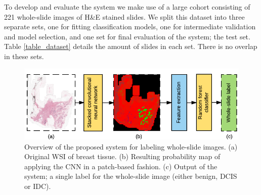 \documentclass[journal]{IEEEtran}
\begin{document}
\bigskip

To develop and evaluate the system we make use of a large cohort consisting of 221 whole-slide images of H\&E stained slides. We split this dataset into three separate sets, one for fitting classification models, one for intermediate validation and model selection, and one set for final evaluation of the system; the test set. Table \ref{table_dataset} details the amount of slides in each set. There is no overlap in these sets.



\begin{figure}[!t]
\centering
\hspace{-0.08in}\includegraphics[width=6in]{system_overview}%
\vspace{-0.1cm}\caption{Overview of the proposed system for labeling whole-slide images. (a) Original WSI of breast tissue. (b) Resulting probability map of applying the CNN in a patch-based fashion. (c) Output of the system; a single label for the whole-slide image (either benign, DCIS or IDC).}
\label{fig_overview}
\end{figure}
\end{document}
